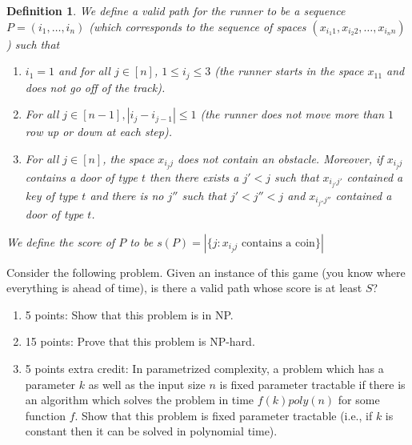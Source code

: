 \documentclass[12pt]{article}
\newtheorem{definition}[theorem]{Definition}
\begin{document}
\begin{definition}
We define a valid path for the runner to be a sequence $P = (i_1,\ldots,i_n)$ (which corresponds to the sequence of spaces $(x_{{i_1}1}, x_{{i_2}2}, \ldots, x_{{i_n}n})$) such that 
\begin{enumerate}
\item $i_1 = 1$ and for all $j \in [n]$, $1 \leq i_j \leq 3$ (the runner starts in the space $x_{11}$ and does not go off of the track).
\item For all $j \in [n-1], |i_{j} - i_{j-1}| \leq 1$ (the runner does not move more than $1$ row up or down at each step).
\item For all $j \in [n]$, the space $x_{{i_j}j}$ does not contain an obstacle. Moreover, if $x_{{i_j}j}$ contains a door of type $t$ then there exists a $j' < j$ such that $x_{{i_{j'}}{j'}}$ contained a key of type $t$ and there is no $j''$ such that $j' < j'' < j$ and $x_{{i_{j''}}{j''}}$ contained a door of type $t$.
\end{enumerate}
We define the score of $P$ to be $s(P) = |\{j:x_{{i_j}j} \text{ contains a coin}\}|$
\end{definition}
Consider the following problem. Given an instance of this game (you know where everything is ahead of time), is there a valid path whose score is at least $S$?
\begin{enumerate}
\item 5 points: Show that this problem is in NP.
\item 15 points: Prove that this problem is NP-hard.
\item 5 points extra credit: In parametrized complexity, a problem which has a parameter $k$ as well as the input size $n$ is fixed parameter tractable if there is an algorithm which solves the problem in time $f(k)poly(n)$ for some function $f$. Show that this problem is fixed parameter tractable (i.e., if $k$ is constant then it can be solved in polynomial time).
\end{enumerate}
\end{document}
